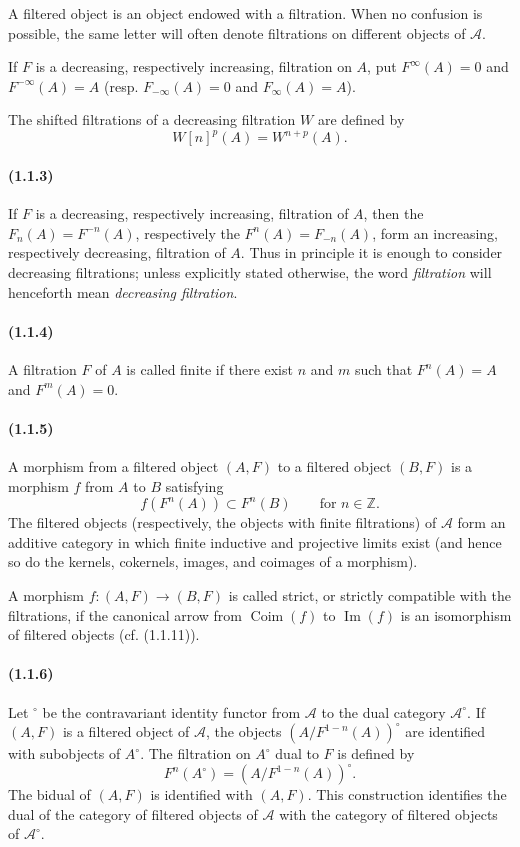 \documentclass[10pt]{article}
\newcommand{\Z}{\mathbb Z}
\newcommand{\Coim}{\operatorname{Coim}}
\newcommand{\Imop}{\operatorname{Im}}
\newcommand{\calA}{\mathcal A}
\begin{document}
A filtered object is an object endowed with a filtration. When no confusion is possible, the same letter will often denote filtrations on different objects of $\calA$.

If $F$ is a decreasing, respectively increasing, filtration on $A$, put $F^\infty(A)=0$ and $F^{-\infty}(A)=A$ (resp. $F_{-\infty}(A)=0$ and $F_{\infty}(A)=A$).

The shifted filtrations of a decreasing filtration $W$ are defined by
\[
W[n]^p(A)=W^{n+p}(A).
\]

\paragraph{(1.1.3)} If $F$ is a decreasing, respectively increasing, filtration of $A$, then the $F_n(A)=F^{-n}(A)$, respectively the $F^n(A)=F_{-n}(A)$, form an increasing, respectively decreasing, filtration of $A$. Thus in principle it is enough to consider decreasing filtrations; unless explicitly stated otherwise, the word \emph{filtration} will henceforth mean \emph{decreasing filtration}.

\paragraph{(1.1.4)} A filtration $F$ of $A$ is called finite if there exist $n$ and $m$ such that $F^n(A)=A$ and $F^m(A)=0$.

\paragraph{(1.1.5)} A morphism from a filtered object $(A,F)$ to a filtered object $(B,F)$ is a morphism $f$ from $A$ to $B$ satisfying
\[
f(F^n(A))\subset F^n(B)\qquad\text{for }n\in\Z.
\]
The filtered objects (respectively, the objects with finite filtrations) of $\calA$ form an additive category in which finite inductive and projective limits exist (and hence so do the kernels, cokernels, images, and coimages of a morphism).

A morphism $f:(A,F)\to(B,F)$ is called strict, or strictly compatible with the filtrations, if the canonical arrow from $\Coim(f)$ to $\Imop(f)$ is an isomorphism of filtered objects (cf. (1.1.11)).

\paragraph{(1.1.6)} Let ${}^{\circ}$ be the contravariant identity functor from $\calA$ to the dual category $\calA^{\circ}$. If $(A,F)$ is a filtered object of $\calA$, the objects $(A/F^{1-n}(A))^{\circ}$ are identified with subobjects of $A^{\circ}$. The filtration on $A^{\circ}$ dual to $F$ is defined by
\[
F^n(A^{\circ})=(A/F^{1-n}(A))^{\circ}.
\]
The bidual of $(A,F)$ is identified with $(A,F)$. This construction identifies the dual of the category of filtered objects of $\calA$ with the category of filtered objects of $\calA^{\circ}$.
\end{document}
